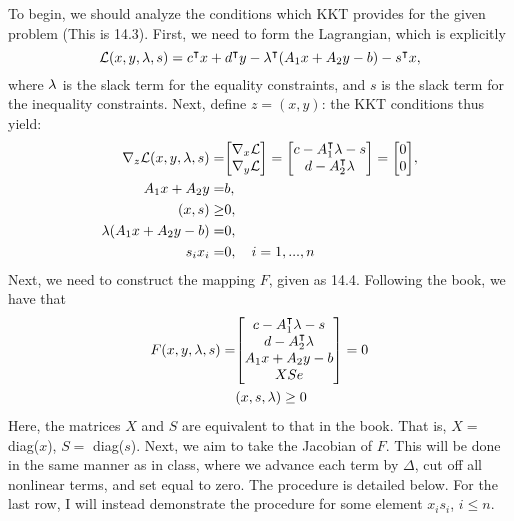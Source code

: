 \begin{solution}

    To begin, we should analyze the conditions which KKT provides for the given problem (This is 14.3). First, we need to form the Lagrangian, which is explicitly
    \[\mathcal{L}(x, y, \mathrm{\lambda}, s) = c^{\intercal} x + d^{\intercal} y - \mathrm{\lambda}^{\intercal} (A_1x + A_2 y - b) - s^{\intercal} x,\]
    where $\mathrm{\lambda}$ is the slack term for the equality constraints, and $s$ is the slack term for the inequality constraints. Next, define $z = (x, y)$: the KKT conditions thus yield:
    \begin{align*}
        \grad_z \scL(x, y, \lm, s) =& \mqty[\grad_x \scL\\\grad_y \scL] = \mqty[c - A_1\T\lm - s\\d - A_2\T \lm] = \mqty[0\\0],\\
        A_1x + A_2y =& b, \\
        (x, s) \geq& 0,\\
        \lm (A_1x + A_2y - b) =& 0,\\
        s_ix_i =& 0, \quad i = 1, ..., n 
    \end{align*}
    Next, we need to construct the mapping $F$, given as 14.4. Following the book, we have that
    \begin{align*}
        F(x, y, \lm, s)=& \mqty[c - A_1\T \lm - s\\ d - A_2\T \lm\\A_1x + A_2y - b\\XSe ] = 0\\
        &(x, s, \lm) \geq 0
    \end{align*}
    Here, the matrices $X$ and $S$ are equivalent to that in the book. That is, $X = $ diag($x$), $S = $ diag($s$). Next, we aim to take the Jacobian of $F$. This will be done in the same manner as in class, where we advance each term by $\Delta$, cut off all nonlinear terms, and set equal to zero. The procedure is detailed below. For the last row, I will instead demonstrate the procedure for some element $x_is_i$, $i \leq n$.


\end{solution}
